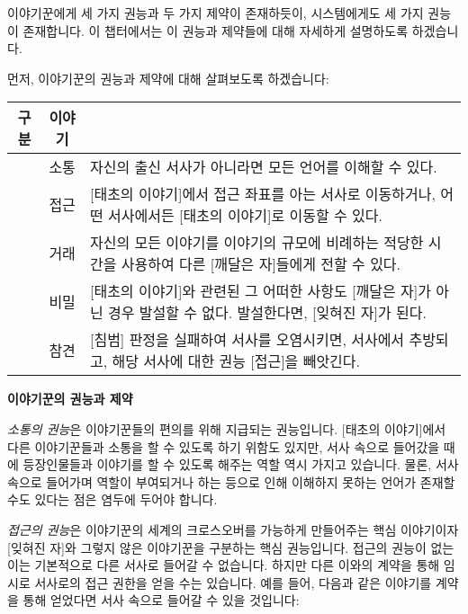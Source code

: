 \documentclass{report}
\begin{document}
	이야기꾼에게 세 가지 권능과 두 가지 제약이 존재하듯이, 시스템에게도 세 가지 권능이 존재합니다. 이 챕터에서는 이 권능과 제약들에 대해 자세하게 설명하도록 하겠습니다.
	
	\bigskip
	
	먼저, 이야기꾼의 권능과 제약에 대해 살펴보도록 하겠습니다:
	
	\smallskip
	
	\begin{minipage}{\textwidth}
		\begin{tabularx}{\textwidth}{c!{\color{black}\vrule}c!{\color{black}\vrule}X}
			\hline
			\textbf{구분} & \textbf{이야기} &  \\ \hline \hline
			[권능] & 소통 & 자신의 출신 서사가 아니라면 모든 언어를 이해할 수 있다. \\ \hline
			[권능] & 접근 & [태초의 이야기]에서 접근 좌표를 아는 서사로 이동하거나, 어떤 서사에서든 [태초의 이야기]로 이동할 수 있다. \\ \hline
			[권능] & 거래 & 자신의 모든 이야기를 이야기의 규모에 비례하는 적당한 시간을 사용하여 다른 [깨달은 자]들에게 전할 수 있다. \\ \hline
			[제약] & 비밀 & [태초의 이야기]와 관련된 그 어떠한 사항도 [깨달은 자]가 아닌 경우 발설할 수 없다. 발설한다면, [잊혀진 자]가 된다. \\ \hline
			[제약] & 참견 & [침범] 판정을 실패하여 서사를 오염시키면, 서사에서 추방되고, 해당 서사에 대한 권능 [접근]을 빼앗긴다. \\\hline
		\end{tabularx}
		
		\smallskip
		
		\begin{tightcenter}
			\textbf{이야기꾼의 권능과 제약}
		\end{tightcenter}
	\end{minipage}
	
	\bigskip
	
	\emph{소통의 권능}은 이야기꾼들의 편의를 위해 지급되는 권능입니다. [태초의 이야기]에서 다른 이야기꾼들과 소통을 할 수 있도록 하기 위함도 있지만, 서사 속으로 들어갔을 때에 등장인물들과 이야기를 할 수 있도록 해주는 역할 역시 가지고 있습니다. 물론, 서사 속으로 들어가며 역할이 부여되거나 하는 등으로 인해 이해하지 못하는 언어가 존재할 수도 있다는 점은 염두에 두어야 합니다.
	
	\smallskip
	
	\emph{접근의 권능}은 이야기꾼의 세계의 크로스오버를 가능하게 만들어주는 핵심 이야기이자 [잊혀진 자]와 그렇지 않은 이야기꾼을 구분하는 핵심 권능입니다. 접근의 권능이 없는 이는 기본적으로 다른 서사로 들어갈 수 없습니다. 하지만 다른 이와의 계약을 통해 임시로 서사로의 접근 권한을 얻을 수는 있습니다. 예를 들어, 다음과 같은 이야기를 계약을 통해 얻었다면 서사 속으로 들어갈 수 있을 것입니다:
	
\end{document}

